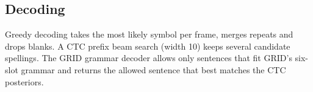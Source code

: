 \subsection{Decoding}
Greedy decoding takes the most likely symbol per frame, merges repeats and drops blanks. A CTC
prefix beam search (width 10) keeps several candidate spellings. The GRID grammar decoder
allows only sentences that fit GRID's six-slot grammar and returns the allowed sentence that
best matches the CTC posteriors.
